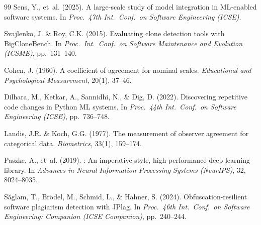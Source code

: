 \documentclass[smallextended,natbib]{svjour3}
\begin{document}
\begin{thebibliography}{99}
Sens, Y., et~al. (2025).
\newblock A large-scale study of model integration in {ML}-enabled software systems.
\newblock In \emph{Proc.\ 47th Int.\ Conf.\ on Software Engineering (ICSE)}.

Svajlenko, J. \& Roy, C.K. (2015).
\newblock Evaluating clone detection tools with {BigCloneBench}.
\newblock In \emph{Proc.\ Int.\ Conf.\ on Software Maintenance and Evolution (ICSME)}, pp.\ 131--140.

Cohen, J. (1960).
\newblock A coefficient of agreement for nominal scales.
\newblock \emph{Educational and Psychological Measurement}, 20(1), 37--46.

Dilhara, M., Ketkar, A., Sannidhi, N., \& Dig, D. (2022).
\newblock Discovering repetitive code changes in {Python} {ML} systems.
\newblock In \emph{Proc.\ 44th Int.\ Conf.\ on Software Engineering (ICSE)}, pp.\ 736--748.

Landis, J.R. \& Koch, G.G. (1977).
\newblock The measurement of observer agreement for categorical data.
\newblock \emph{Biometrics}, 33(1), 159--174.

Paszke, A., et~al. (2019).
: An imperative style, high-performance deep learning library.
\newblock In \emph{Advances in Neural Information Processing Systems (NeurIPS)}, 32, 8024--8035.

S\u{a}glam, T., Br\"{o}del, M., Schmid, L., \& Hahner, S. (2024).
\newblock Obfuscation-resilient software plagiarism detection with {JPlag}.
\newblock In \emph{Proc.\ 46th Int.\ Conf.\ on Software Engineering: Companion (ICSE Companion)}, pp.\ 240--244.

\end{thebibliography}
\end{document}
